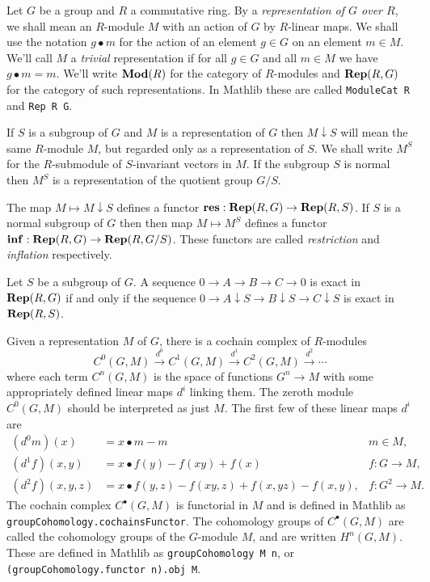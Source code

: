 Let $G$ be a group and $R$ a commutative ring.
By a \emph{representation of $G$ over $R$},
we shall mean an $R$-module $M$ with an action of $G$ by $R$-linear maps.
We shall use the notation $g \bullet m$ for the action of an element $g \in G$
on an element $m \in M$.
We'll call $M$ a \emph{trivial} representation if for all $g \in G$ and all $m \in M$ we
have $g \bullet m = m$.
We'll write $\mathbf{Mod}(R)$ for the category of $R$-modules and $\mathbf{Rep}(R,G)$
for the category of such representations.
In Mathlib these are called \texttt{ModuleCat R} and \texttt{Rep R G}.

If $S$ is a subgroup of $G$ and $M$ is a representation of $G$
then $M \downarrow S$ will mean the same $R$-module $M$,
but regarded only as a representation of $S$.
We shall write $M^S$ for the $R$-submodule of $S$-invariant vectors in $M$.
If the subgroup $S$ is normal then $M^S$ is a representation of the quotient group $G/S$.

\begin{definition} \label{def:inflation restriction functors}
	The map $M \mapsto M \downarrow S$ defines a functor $\mathbf{res} : \mathbf{Rep}(R,G) \to \mathbf{Rep}(R,S)$.
	If $S$ is a normal subgroup of $G$ then then map $M \mapsto M^S$ defines
	a functor $\mathbf{inf} : \mathbf{Rep}(R,G) \to \mathbf{Rep}(R, G/S)$.
	These functors are called \emph{restriction} and \emph{inflation} respectively.
\end{definition}

\begin{lemma} \label{lem:restriction exact}
	\leanok
	Let $S$ be a subgroup of $G$.
	A sequence $0 \to A \to B \to C \to 0$ is exact in $\mathbf{Rep}(R,G)$ if and only if
	the sequence $0 \to A \downarrow S \to B \downarrow S \to C \downarrow S$ is exact
	in $\mathbf{Rep}(R,S)$.
\end{lemma}

Given a representation $M$ of $G$, there is a cochain complex of $R$-modules
\[
	C^0(G,M) \stackrel{d^0}\to C^1(G,M)  \stackrel{d^1}\to C^2(G,M)  \stackrel{d^2}\to \cdots
\]
where each term $C^n(G,M)$ is the space of functions $G^n \to M$ with some appropriately defined
linear maps $d^i$ linking them.
The zeroth module $C^0(G,M)$ should be interpreted as just $M$.
The first few of these linear maps $d^i$ are
\begin{align*}
	(d^0 m)(x) &= x \bullet m - m
	& m \in M, \\
	(d^1 f)(x,y) &= x \bullet f(y) - f(xy) + f(x)
	& f : G \to M,\\
	(d^2 f)(x,y,z) &= x\bullet f(y,z) - f(xy,z) + f(x,yz) - f(x,y),
	& f : G^2 \to M.
\end{align*}
The cochain complex $C^\bullet(G,M)$ is functorial in $M$ and is defined in Mathlib as
\texttt{groupCohomology.cochainsFunctor}.
The cohomology groups of $C^\bullet(G,M)$ are called the cohomology groups of the
$G$-module $M$, and are written $H^n(G,M)$. These are defined in Mathlib as
\texttt{groupCohomology M n}, or \texttt{(groupCohomology.functor n).obj M}.

